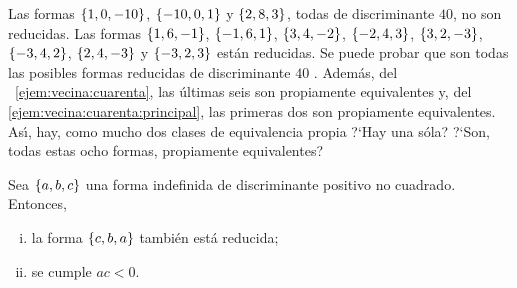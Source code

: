 \begin{ejemIndefinidas}\label{ejem:reducida:cuarenta}
	Las formas $\left\{1,0,-10\right\}$, $\left\{-10,0,1\right\}$ y
	$\left\{2,8,3\right\}$, todas de discriminante $40$,
	no son reducidas. Las formas
	$\left\{1,6,-1\right\}$, $\left\{-1,6,1\right\}$,
	$\left\{3,4,-2\right\}$, $\left\{-2,4,3\right\}$, $\left\{3,2,-3\right\}$,
	$\left\{-3,4,2\right\}$, $\left\{2,4,-3\right\}$ y $\left\{-3,2,3\right\}$
	est\'an reducidas. Se puede probar que son todas las posibles
	formas reducidas de discriminante $40$ \quedacomoejercicio.
	Adem\'as, del \ejemname~\ref{ejem:vecina:cuarenta}, las \'ultimas
	seis son propiamente equivalentes y, del \ejemname~%
	\ref{ejem:vecina:cuarenta:principal}, las primeras dos son
	propiamente equivalentes. As\'{\i}, hay, como mucho dos clases
	de equivalencia propia ?`Hay una s\'ola? ?`Son, todas estas ocho
	formas, propiamente equivalentes?
\end{ejemIndefinidas}

% 

\begin{lemaIndefinidas}\label{lema:indefinidas:reducida}
	Sea $\left\{a,b,c\right\}$ una forma indefinida de discriminante
	positivo no cuadrado. Entonces,
	\begin{enumerate}[(i)]
		\item\label{item:lema:indefinidas:reducida:simetria}
			la forma $\left\{c,b,a\right\}$ tambi\'en est\'a reducida;
		\item\label{item:lema:indefinidas:reducida:signo}
			se cumple $ac<0$.
	\end{enumerate}
\end{lemaIndefinidas}


